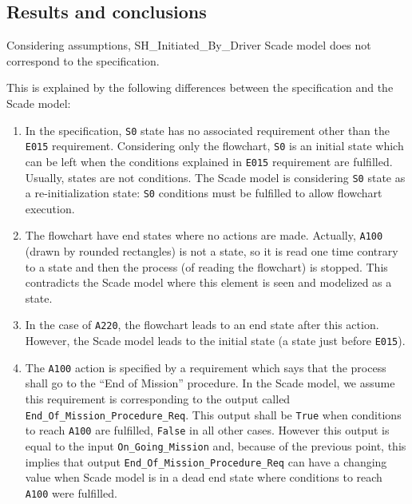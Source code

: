\subsection{Results and conclusions}
\label{SH-results-and-conclusions}
Considering assumptions, SH\_Initiated\_By\_Driver Scade model does
not correspond to the specification.

This is explained by the following differences between the
specification and the Scade model:
\begin{enumerate} 
\item \label{s0-case}In the specification, \texttt{S0} state has no associated
  requirement other than the \texttt{E015} requirement. Considering
  only the flowchart, \texttt{S0} is an initial state which can be
  left when the conditions explained in \texttt{E015} requirement are
  fulfilled. Usually, states are not conditions.  The Scade model is
  considering \texttt{S0} state as a re-initialization state:
  \texttt{S0} conditions must be fulfilled to allow flowchart
  execution.
\item \label{a100-case}The flowchart have end states where no actions
  are made. Actually, \texttt{A100} (drawn by rounded rectangles) is
  not a state, so it is read one time contrary to a state and then the
  process (of reading the flowchart) is stopped. This contradicts the
  Scade model where this element is seen and modelized as a state.
\item \label{a220-case}In the case of \texttt{A220}, the flowchart leads to an end
  state after this action. However, the Scade model leads to the
  initial state (a state just before \texttt{E015}).
\item \label{eom-case}The \texttt{A100} action is specified by a requirement which
  says that the process shall go to the ``End of Mission''
  procedure. In the Scade model, we assume this requirement is
  corresponding to the output called
  \texttt{End\_Of\_Mission\_Procedure\_Req}. This output shall be
  \texttt{True} when conditions to reach \texttt{A100} are fulfilled,
  \texttt{False} in all other cases. However this output is equal to
  the input \texttt{On\_Going\_Mission} and, because of the previous
  point, this implies that output
  \texttt{End\_Of\_Mission\_Procedure\_Req} can have a changing value
  when Scade model is in a dead end state where conditions to reach
  \texttt{A100} were fulfilled.
\end{enumerate} 

